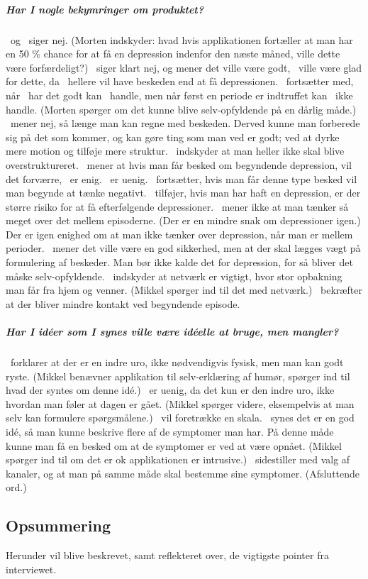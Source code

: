 \subparagraph{Har I nogle bekymringer om produktet?}
\pa~og \pe~siger nej.
(Morten indskyder: hvad hvis applikationen fortæller at man har en 50 \% chance for at få en depression indenfor den næste måned, ville dette være forfærdeligt?)
\pa~siger klart nej, og mener det ville være godt, \pa~ville være glad for dette, da \pa~hellere vil have beskeden end at få depressionen.
\pa~fortsætter med, når \pa~har det godt kan \pa~handle, men når først en periode er indtruffet kan \pa~ikke handle.
(Morten spørger om det kunne blive selv-opfyldende på en dårlig måde.)
\pe~mener nej, så længe man kan regne med beskeden.
Derved kunne man forberede sig på det som kommer, og kan gøre ting som man ved er godt; ved at dyrke mere motion og tilføje mere struktur.
\pa~indskyder at man heller ikke skal blive overstruktureret.
\pe~mener at hvis man får besked om begyndende depression, vil det forværre, \pd~er enig.
\pa~er uenig.
\pd~fortsætter, hvis man får denne type besked vil man begynde at tænke negativt.
\pe~tilføjer, hvis man har haft en depression, er der større risiko for at få efterfølgende depressioner.
\pe~mener ikke at man tænker så meget over det mellem episoderne.
(Der er en mindre snak om depressioner igen.)
Der er igen enighed om at man ikke tænker over depression, når man er mellem perioder.
\pa~mener det ville være en god sikkerhed, men at der skal lægges vægt på formulering af beskeder.
Man bør ikke kalde det for depression, for så bliver det måske selv-opfyldende.
\pd~indskyder at netværk er vigtigt, hvor stor opbakning man får fra hjem og venner.
(Mikkel spørger ind til det med netværk.)
\pd~bekræfter at der bliver mindre kontakt ved begyndende episode.

\subparagraph{Har I idéer som I synes ville være idéelle at bruge, men mangler?}
\pa~forklarer at der er en indre uro, ikke nødvendigvis fysisk, men man kan godt ryste.
(Mikkel benævner applikation til selv-erklæring af humør, spørger ind til hvad der syntes om denne idé.)
\pa~er uenig, da det kun er den indre uro, ikke hvordan man føler at dagen er gået.
(Mikkel spørger videre, eksempelvis at man selv kan formulere spørgsmålene.)
\pa~vil foretrække en skala.
\pa~synes det er en god idé, så man kunne beskrive flere af de symptomer man har.
På denne måde kunne man få en besked om at de symptomer er ved at være opnået.
(Mikkel spørger ind til om det er ok applikationen er intrusive.)
\pa~sidestiller med valg af kanaler, og at man på samme måde skal bestemme sine symptomer.
(Afsluttende ord.)

\subsection{Opsummering}
Herunder vil blive beskrevet, samt reflekteret over, de vigtigste pointer fra interviewet.

